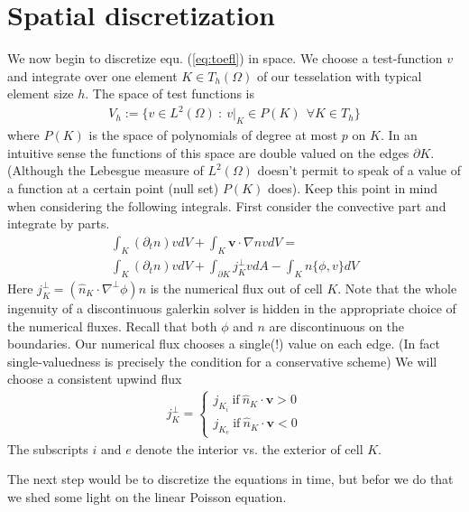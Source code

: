 \documentclass[a4paper,12pt]{scrartcl}
\renewcommand{\vec}[1]{{\mathbf{#1}}}
\begin{document}
\section{ Spatial discretization}
We now begin to discretize equ. (\ref{eq:toefl}) in space. 
We choose a test-function $v$ and integrate over one element $K \in T_h(\Omega)$ 
of our tesselation with typical element size $h$. The space of test functions is
\begin{align}
    V_h := \{ v \in L^2(\Omega) \ :\  v|_K\in P(K)\ \ \forall K\in T_h\}
    \label{eq:test_space}
\end{align}
where $P(K)$ is the space of polynomials of degree at most $p$ on $K$. 
In an intuitive sense the functions of this space are double valued on the edges
$\partial K$. (Although the Lebesgue measure of $L^2(\Omega)$ doesn't permit 
to speak of a value of a function at a certain point (null set) $P(K)$ does).
Keep this point in mind when considering the following integrals. 
First consider the convective part and integrate by parts. 
\begin{subequations}
\begin{align}
    \int_K (\partial_t n) v dV + \int_K \vec v\cdot \nabla n v dV = \\
    \int_K (\partial_t n) v dV + \int_{\partial K} j^{\perp}_K v dA - \int_K n \{\phi, v\}dV 
\end{align}
\end{subequations}
Here $j^{\perp}_K = (\hat n_K \cdot \nabla^{\perp} \phi) n$ is the numerical flux out of cell $K$.  Note that the whole 
ingenuity of a discontinuous galerkin solver is hidden in the appropriate choice 
of the numerical fluxes. Recall that both $\phi$ and $n$ are discontinuous 
on the boundaries. Our numerical flux chooses a single(!) value on each edge. (In
fact single-valuedness is precisely the condition for a conservative scheme)
We will choose a consistent upwind flux
\begin{align}
    j^{\perp}_K = \begin{cases}
                    j_{K_i}\  \text{if}\  \hat n_K \cdot \vec v > 0  \\
                    j_{K_e}\  \text{if}\  \hat n_K \cdot \vec v < 0 
                    \end{cases}
    \label{eq:flux}
\end{align}
The subscripts $i$ and $e$ denote the interior vs. the exterior of cell $K$.

The next step would be to discretize the equations in time, but befor we do that
we shed some light on the linear Poisson equation. 
\end{document}
